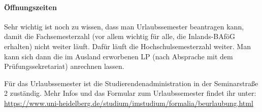 \paragraph{Öffnungszeiten} \auslandsbafoegamtoeff

Sehr wichtig ist noch zu wissen, dass man Urlaubssemester beantragen kann, damit die Fachsemesterzahl (vor allem wichtig für alle, die Inlands-BAföG erhalten) nicht weiter läuft. Dafür läuft die Hochschulsemesterzahl weiter. Man kann sich dann die im Ausland erworbenen \gls{LP} (nach Absprache mit dem Prüfungssekretariat) anrechnen lassen.

Für das Urlaubssemester ist die Studierendenadministration in der Seminarstraße 2 zuständig. Mehr Infos und das Formular zum Urlaubssemester findet ihr unter:
\url{https://www.uni-heidelberg.de/studium/imstudium/formalia/beurlaubung.html}

